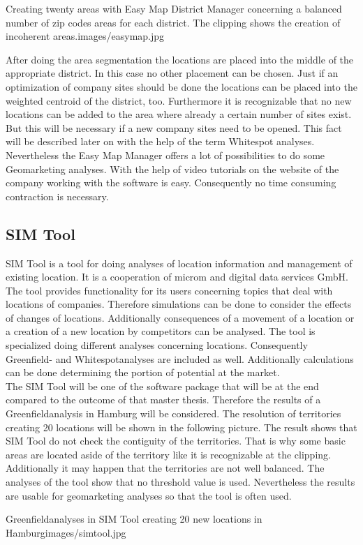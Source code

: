 \begin{figureOwn}{Creating twenty areas with Easy Map District Manager concerning a balanced number of zip codes areas for each district. The clipping shows the creation of incoherent areas.}{images/easymap.jpg}\end{figureOwn}


After doing the area segmentation the locations are placed into the middle of the appropriate district. In this case no other placement can be chosen. Just if an optimization of company sites should be done the locations can be placed into the weighted centroid of the district, too. Furthermore it is recognizable that no new locations can be added to the area where already a certain number of sites exist. But this will be necessary if a new company sites need to be opened. This fact will be described later on with the help of the term Whitespot analyses. \\
Nevertheless the Easy Map Manager offers a lot of possibilities to do some Geomarketing analyses. With the help of video tutorials on the website of the company working with the software is easy. Consequently no time consuming contraction is necessary. 

\subsection{SIM Tool}
SIM Tool is a tool for doing analyses of location information and management of existing location. It is a cooperation of microm and digital data services GmbH. The tool provides functionality for its users concerning topics that deal with locations of companies. Therefore simulations can be done to consider the effects of changes of locations. Additionally consequences of a movement of a location or a creation of a new location by competitors can be analysed. The tool is specialized doing different analyses concerning locations. Consequently Greenfield- and Whitespotanalyses are included as well. Additionally calculations can be done determining the portion of potential at the market. \\
The SIM Tool will be one of the software package that will be at the end compared to the outcome of that master thesis. Therefore the results of a Greenfieldanalysis in Hamburg will be considered. The resolution of territories creating 20 locations will be shown in the following picture. The result shows that SIM Tool do not check the contiguity of the territories. That is why some basic areas are located aside of the territory like it is recognizable at the clipping. Additionally it may happen that the territories are not well balanced. The analyses of the tool show that no threshold value is used. Nevertheless the results are usable for geomarketing analyses so that the tool is often used.

\begin{figureOwn}{Greenfieldanalyses in SIM Tool creating 20 new locations in Hamburg}{images/simtool.jpg}\end{figureOwn}

